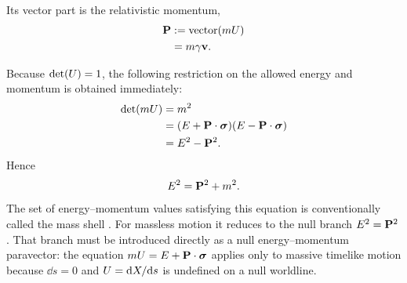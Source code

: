 Its vector part is the relativistic momentum,
\begin{align*}
\mathbf{P}
&:=\operatorname{vector}(mU)\notag\\
&=m\gamma\mathbf{v}.
\end{align*}

Because \(\operatorname{det}\!\left(U\right)=1\), the following restriction on the allowed energy
and momentum is obtained immediately:
\begin{align*}
\operatorname{det}\!\left(mU\right)
&=m^{2}\notag\\
&=(E+\mathbf{P}\cdot\mathbf{\bm{\sigma}})(E-\mathbf{P}\cdot\mathbf{\bm{\sigma}})\notag\\
&=E^{2}-\mathbf{P}^{2}.
\end{align*}
Hence
\begin{equation*}
E^{2}=\mathbf{P}^{2}+m^{2}.
\end{equation*}
The set of energy--momentum values satisfying this equation is
conventionally called the mass shell \cite{dirac1928,greiner2000}. For
massless motion it reduces to the null branch
\(E^{2}=\mathbf{P}^{2}\). That branch must be introduced directly as a null
energy--momentum paravector: the equation
\(mU=E+\mathbf{P}\cdot\mathbf{\bm{\sigma}}\) applies only to massive timelike motion
because \(\dd s=0\) and \(U=\mathrm dX/\mathrm d s\) is undefined on a null
worldline.

